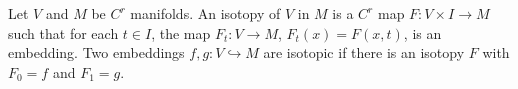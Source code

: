 Let $V$ and $M$ be $C^r$ manifolds. An isotopy of $V$ in $M$ is a $C^r$ map $F: V \times I \to M$ such that for each $t \in I$, the map $F_t: V \to M$, $F_t(x) = F(x, t)$, is an embedding. Two embeddings $f, g: V \hookrightarrow M$ are isotopic if there is an isotopy $F$ with $F_0 = f$ and $F_1 = g$.

